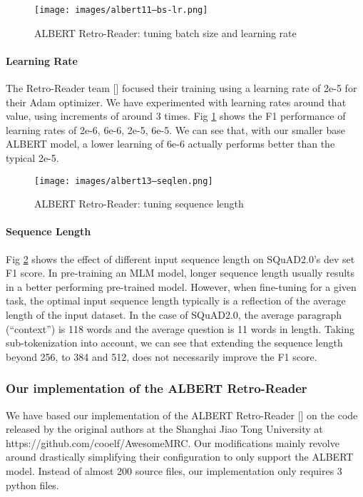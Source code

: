 \documentclass{article}
\begin{document}
\begin{figure}[h]
  \texttt{[image: images/albert11--bs-lr.png]}
  \centering
  \caption{ALBERT Retro-Reader: tuning batch size and learning rate}
  \label{fig:albert11batchsizeLearningrate}
\end{figure}


\paragraph{Learning Rate}
The Retro-Reader team [] focused their training using a learning rate of 2e-5 for their Adam optimizer.  We have experimented with learning rates around that value, using increments of around 3 times.  Fig \ref{fig:albert11batchsizeLearningrate} shows the F1 performance of learning rates of 2e-6, 6e-6, 2e-5, 6e-5.  We can see that, with our smaller base ALBERT model, a lower learning of 6e-6 actually performs better than the typical 2e-5.


\begin{figure}[h]
  \texttt{[image: images/albert13--seqlen.png]}
  \centering
  \caption{ALBERT Retro-Reader: tuning sequence length}
  \label{fig:albert13seqlen}
\end{figure}


\paragraph{Sequence Length}
Fig \ref{fig:albert13seqlen} shows the effect of different input sequence length on SQuAD2.0’s dev set F1 score.  In pre-training an MLM model, longer sequence length usually results in a better performing pre-trained model.  However, when fine-tuning for a given task, the optimal input sequence length typically is a reflection of the average length of the input dataset.  In the case of SQuAD2.0, the average paragraph (“context”) is 118 words and the average question is 11 words in length.  Taking sub-tokenization into account, we can see that extending the sequence length beyond 256, to 384 and 512, does not necessarily improve the F1 score.


\subsubsection{Our implementation of the ALBERT Retro-Reader}
We have based our implementation of the ALBERT Retro-Reader [] on the code released by the original authors at the Shanghai Jiao Tong University at https://github.com/cooelf/AwesomeMRC.  Our modifications mainly revolve around drastically simplifying their configuration to only support the ALBERT model.  Instead of almost 200 source files, our implementation only requires 3 python files.
\end{document}
